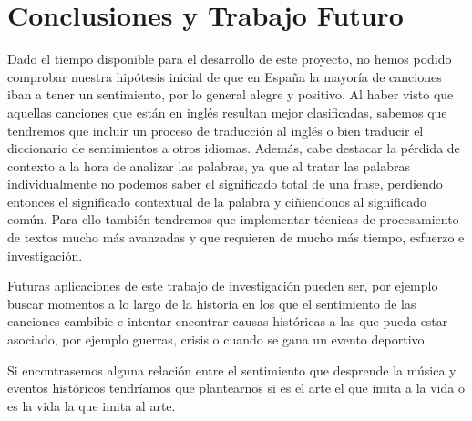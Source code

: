 \chapter{Conclusiones y Trabajo Futuro}
\label{cap:conclusiones}

Dado el tiempo disponible para el desarrollo de este proyecto, no hemos podido comprobar nuestra hipótesis inicial de que en España la mayoría de canciones iban a tener un sentimiento, por lo general alegre y positivo. Al haber visto que aquellas canciones que están en inglés resultan mejor clasificadas, sabemos que tendremos que incluir un proceso de traducción al inglés o bien traducir el diccionario de sentimientos a otros idiomas. Además, cabe destacar la pérdida de contexto a la hora de analizar las palabras, ya que al tratar las palabras individualmente no podemos saber el significado total de una frase, perdiendo entonces el significado contextual de la palabra y ciñiendonos al significado común. Para ello también tendremos que implementar técnicas de procesamiento de textos mucho más avanzadas y que requieren de mucho más tiempo, esfuerzo e investigación.

Futuras aplicaciones de este trabajo de investigación pueden ser, por ejemplo buscar momentos a lo largo de la historia en los que el sentimiento de las canciones cambibie e intentar encontrar causas históricas a las que pueda estar asociado, por ejemplo guerras, crisis o cuando se gana un evento deportivo. 

Si encontrasemos alguna relación entre el sentimiento que desprende la música y eventos históricos tendríamos que plantearnos si es el arte el que imita a la vida o es la vida la que imita al arte.
